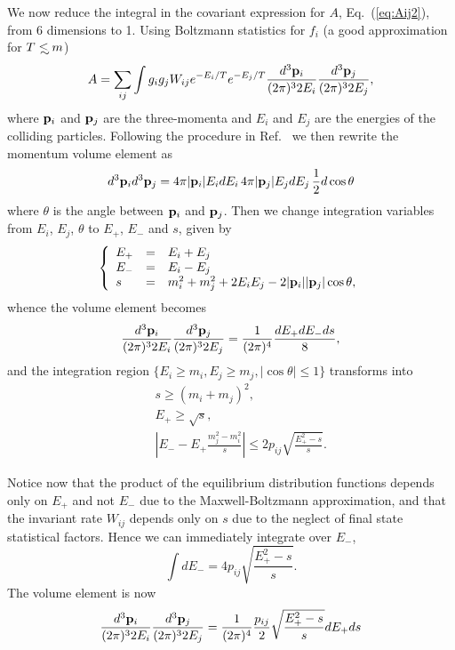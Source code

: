 \documentclass[a4paper,10pt,oneside]{book}
\def\lsim{\mathrel{\rlap{\lower4pt\hbox{\hskip1pt$\sim$}}
    \raise1pt\hbox{$<$}}}         %
\begin{document}
We now reduce the integral in the covariant expression for $A$,
Eq.~(\ref{eq:Aij2}), from 6 dimensions to 1.
Using Boltzmann statistics for $f_i$ (a good approximation for
$T\lsim m$)
\begin{equation} \label{eq:Aij2b}
  A =
  \sum_{ij} \int g_i g_j W_{ij} e^{-E_{i}/T} e^{-E_{j}/T} 
\frac{d^3{\bf p}_i}{(2\pi)^3 2E_i}
  \frac{d^3{\bf p}_j}{(2\pi)^3 2E_j} ,
\end{equation}
where ${\bf p}_{i}$ and ${\bf p}_{j}$ are the three-momenta and
$E_{i}$ and $E_{j}$ are the energies of the colliding particles.
Following the procedure in Ref.~\cite{Gondolo:1990dk} we then rewrite
the momentum volume element as
\begin{equation}
  d^3 {\bf p}_{i} d^3 {\bf p}_{j} = 4 \pi |{\bf p}_{i}| E_i dE_{i}
  \, 4 \pi |{\bf p}_{j}| E_j dE_{j} \, \frac{1}{2} d \cos \theta
\end{equation}
where $\theta$ is the angle between ${\bf p}_{i}$ and 
${\bf p}_{j}$. Then we change integration variables from 
$E_{i}$, $E_{j}$, $\theta$ to $E_{+}$, $E_{-}$ and $s$, given by
\begin{equation}
  \left\{ \begin{array}{lcl}
  E_{+} & = & E_{i}+E_{j} \\
  E_{-} & = & E_{i}-E_{j} \\
  s & = & m_{i}^2+m_{j}^2 + 2E_{i}E_{j}-2 |{\bf p}_{i}| |{\bf
    p}_{j}| \cos \theta,
  \end{array} \right.
\end{equation}
whence the volume element becomes
\begin{equation}
  \frac{d^3{\bf p}_i}{(2\pi)^3 2E_i} \frac{d^3{\bf p}_j}{(2\pi)^3 2E_j} =
  \frac{1}{(2\pi)^4} \frac{dE_{+}dE_{-}ds}{8},
\end{equation}
and the integration region $\{ E_i \geq m_i, E_j \geq m_j, |\cos \theta| 
\leq
1\}$ transforms into 
\begin{eqnarray}
  && s \geq (m_i+m_j)^2, \\ && E_{+} \geq \sqrt{s} , \\ && \left\vert
  E_{-} - E_{+} \frac{m_j^2-m_i^2}{s} \right\vert \leq 2 p_{ij}
  \sqrt{\frac{E_{+}^2-s}{s}}.
\end{eqnarray}

Notice now that the product of the equilibrium distribution
functions depends only on $E_{+}$ and not $E_{-}$ due to the
Maxwell-Boltzmann approximation, and that the invariant rate
$W_{ij}$ depends only on $s$ due to the neglect of final state
statistical factors. Hence we can immediately integrate over
$E_{-}$,
\begin{equation}
  \int dE_{-} = 4p_{ij} \sqrt{\frac{E_{+}^2-s}{s}}.
\end{equation}
The volume element is now
\begin{equation}
  \frac{d^3{\bf p}_i}{(2\pi)^3 2E_i} \frac{d^3{\bf p}_j}{(2\pi)^3 2E_j} = 
  \frac{1}{(2\pi)^4} \frac{p_{ij}}{2} \sqrt{\frac{E_{+}^2-s}{s}} 
dE_{+} ds 
\end{equation}
\end{document}
